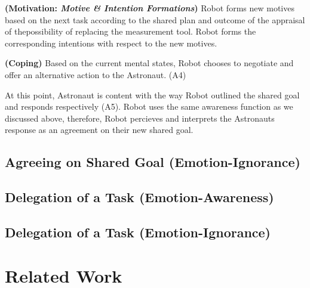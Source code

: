 \noindent\textbf{(Motivation: \textit{Motive \& Intention Formations})} Robot
forms new motives based on the next task according to the shared plan and
outcome of the appraisal of thepossibility of replacing the measurement tool.
Robot forms the corresponding intentions with respect to the new motives.

\noindent\textbf{(Coping)} Based on the current mental states, Robot
chooses to negotiate and offer an alternative action to the Astronaut. (A4)

\noindent{}

At this point, Astronaut is content with the way Robot outlined the shared goal
and responds respectively (A5). Robot uses the same awareness function as we
discussed above, therefore, Robot percieves and interprets the Astronauts
response as an agreement on their new shared goal.

\noindent{}

\subsection{Agreeing on Shared Goal (Emotion-Ignorance)}
\label{sec:wt-exp2}

\subsection{Delegation of a Task (Emotion-Awareness)}
\label{sec:wt-exp3}

\subsection{Delegation of a Task (Emotion-Ignorance)}
\label{sec:wt-exp4}

\section{Related Work}

